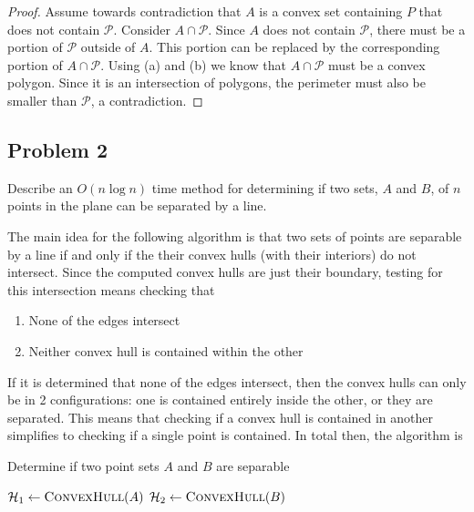\documentclass{eeleyes}
\begin{document}
\begin{proof}
    Assume towards contradiction that $A$ is a convex set containing $P$ that does not contain $\mathcal{P}$. Consider $A \cap \mathcal{P}$. Since $A$ does not contain $\mathcal{P}$, there must be a portion of $\mathcal{P}$ outside of $A$. This portion can be replaced by the corresponding portion of $A \cap \mathcal{P}$. Using (a) and (b) we know that $A \cap \mathcal{P}$ must be a convex polygon. Since it is an intersection of polygons, the perimeter must also be smaller than $\mathcal{P}$, a contradiction.
\end{proof}

\subsection*{Problem 2}

\begin{problem}
    Describe an $O(n \log n)$ time method for determining if two sets, $A$ and $B$, of $n$ points in the plane can be separated by a line.
\end{problem}
The main idea for the following algorithm is that two sets of points are separable by a line if and only if the their convex hulls (with their interiors) do not intersect. Since the computed convex hulls are just their boundary, testing for this intersection means checking that
\begin{enumerate}
    \item None of the edges intersect
    \item Neither convex hull is contained within the other
\end{enumerate}

If it is determined that none of the edges intersect, then the convex hulls can only be in 2 configurations: one is contained entirely inside the other, or they are separated. 
\marginpar{$(\star)$}
This means that checking if a convex hull is contained in another simplifies to checking if a single point is contained. In total then, the algorithm is 

\begin{algorithm}[H]
\caption{Determine if two point sets $A$ and $B$ are separable}
\begin{algorithmic}[1]
        \State $\mathcal{H}_1 \gets \Call{ConvexHull}{A}$
        \State $\mathcal{H}_2 \gets \Call{ConvexHull}{B}$

            \State {}
            \State {}
            \State {}
        \Else
            \State {}
        \EndIf
    \EndProcedure
\end{algorithmic}
\end{algorithm}
\end{document}
